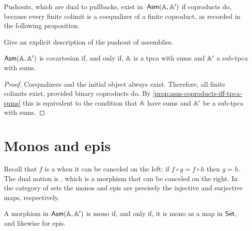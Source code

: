 Pushouts, which are dual to pullbacks, exist in~$\AsmA$ if coproducts
do, because every finite colimit is a coequalizer of a finite
coproduct, as recorded in the following proposition.

\begin{exercise}
  Give an explicit description of the pushout of assemblies.
\end{exercise}


\begin{proposition}
  \label{prop:asm-cocartesian}%
  $\AsmA$ is cocartesian if, and
  only if, $\AA$ is a tpca with sums and $\subAA$ a sub-tpca with
  sums.
\end{proposition}

\begin{proof}
  Coequalizers and the initial object always exist. Therefore, all
  finite colimits exist, provided binary coproducts do. By
  \cref{prop:asm-coproducts-iff-tpca-sums} this is
  equivalent to the condition that $\AA$ have sums and $\subAA$ be a
  sub-tpca with sums.
\end{proof}


\section{Monos and epis}
\label{sec:monos-epis}

Recall that $f$ is a  when it can be
canceled on the left: if $f \circ g = f \circ h$ then $g = h$. The
dual notion is , which is a morphism that can
be canceled on the right. In the category of sets the monos and epis
are precisely the injective and surjective maps, respectively.

\begin{proposition}
  \label{prop:asm-mono-epi-when}%
  A morphism in $\AsmA$ is mono if, and only if, it is mono as a map
  in $\Set$, and likewise for epis.
\end{proposition}

